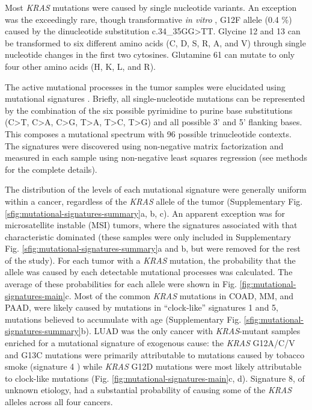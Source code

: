 \documentclass[english, 12pt, letterpaper]{article}
\newcommand{\KRAS}{\emph{KRAS}}
\begin{document}
Most \KRAS{} mutations were caused by single nucleotide variants.
An exception was the exceedingly rare, though transformative \emph{in vitro} \cite{Barbacid1987}, G12F allele (0.4 \%) caused by the dinucleotide substitution c.34\_35GG>TT. Glycine 12 and 13 can be transformed to six different amino acids (C, D, S, R, A, and V) through single nucleotide changes in the first two cytosines.
Glutamine 61 can mutate to only four other amino acids (H, K, L, and R).

The active mutational processes in the tumor samples were elucidated using mutational signatures \cite{Alexandrov2013}. 
Briefly, all single-nucleotide mutations can be represented by the combination of the six possible pyrimidine to purine base substitutions (C>T, C>A, C>G, T>A, T>C, T>G) and all possible 3’ and 5’ flanking bases. 
This composes a mutational spectrum with 96 possible trinucleotide contexts. 
The signatures were discovered using non-negative matrix factorization and measured in each sample using non-negative least squares regression (see methods for the complete details). 

The distribution of the levels of each mutational signature were generally uniform within a cancer, regardless of the \KRAS{} allele of the tumor (Supplementary Fig. \ref{sfig:mutational-signatures-summary}a, b, c). 
An apparent exception was for microsatellite instable (MSI) tumors, where the signatures associated with that characteristic dominated (these samples were only included in Supplementary Fig. \ref{sfig:mutational-signatures-summary}a and b, but were removed for the rest of the study). 
For each tumor with a \KRAS{} mutation, the probability that the allele was caused by each detectable mutational processes was calculated. 
The average of these probabilities for each allele were shown in Fig. \ref{fig:mutational-signatures-main}c. 
Most of the common \KRAS{} mutations in COAD, MM, and PAAD, were likely caused by mutations in “clock-like” signatures 1 and 5, mutations believed to accumulate with age \cite{Alexandrov2015} (Supplementary Fig. \ref{sfig:mutational-signatures-summary}b). 
LUAD was the only cancer with \KRAS{}-mutant samples enriched for a mutational signature of exogenous cause: the \KRAS{} G12A/C/V and G13C mutations were primarily attributable to mutations caused by tobacco smoke (signature 4 \cite{Alexandrov2016}) while \KRAS{} G12D mutations were most likely attributable to clock-like mutations (Fig. \ref{fig:mutational-signatures-main}c, d).
Signature 8, of unknown etiology, had a substantial probability of causing some of the \KRAS{} alleles across all four cancers.
\end{document}
